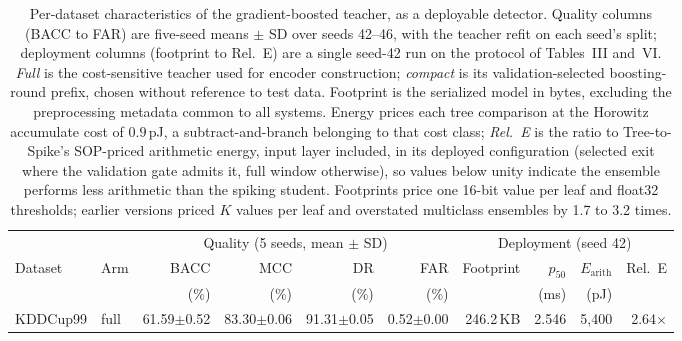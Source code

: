 \begin{table}[!t]
\centering
\caption{Per-dataset characteristics of the gradient-boosted teacher, as a
deployable detector. Quality columns (BACC to FAR) are five-seed means $\pm$ SD
over seeds 42--46, with the teacher refit on each seed's split; deployment columns
(footprint to Rel.\ E) are a single seed-42 run on the protocol of Tables~III
and~VI. \emph{Full} is the cost-sensitive teacher used for
encoder construction; \emph{compact} is its validation-selected boosting-round
prefix, chosen without reference to test data. Footprint is the serialized model
in bytes, excluding the preprocessing metadata common to all systems. Energy
prices each tree comparison at the Horowitz accumulate cost of $0.9$\,pJ, a
subtract-and-branch belonging to that cost class; \emph{Rel.\ E} is the ratio to
Tree-to-Spike's SOP-priced arithmetic energy, input layer included, in its
deployed configuration (selected exit where the validation gate admits it, full
window otherwise), so values below unity indicate the ensemble performs less
arithmetic than the spiking student. Footprints price one 16-bit value per leaf
and float32 thresholds; earlier versions priced $K$ values per leaf and overstated
multiclass ensembles by 1.7 to 3.2 times.}
\label{tab:dep:teacher}
\small
\setlength{\tabcolsep}{4pt}
\begin{tabular}{llrrrrrrrr}
\toprule
 & & \multicolumn{4}{c}{Quality (5 seeds, mean $\pm$ SD)} & \multicolumn{4}{c}{Deployment (seed 42)} \\
\cmidrule(lr){3-6}\cmidrule(lr){7-10}
Dataset & Arm & BACC & MCC & DR & FAR & Footprint & $p_{50}$ & $E_\mathrm{arith}$ & Rel.\ E \\
 & & (\%) & (\%) & (\%) & (\%) & & (ms) & (pJ) & \\
\midrule
\multirow{2}{*}{KDDCup99} & full & 61.59$\pm$0.52 & 83.30$\pm$0.06 & 91.31$\pm$0.05 & 0.52$\pm$0.00 & 246.2\,KB & 2.546 & 5,400 & 2.64$\times$ \\

\end{tabular}
\end{table}
